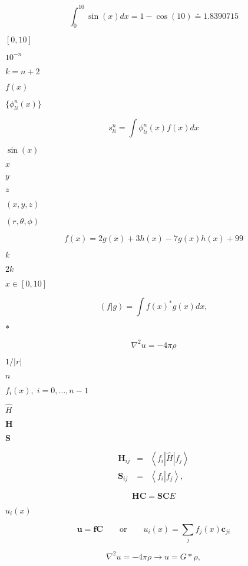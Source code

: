 \documentclass{article}
\begin{document}
\[
\int_{0}^{10} \sin (x) \mathit{dx} = 1 - \cos(10) \doteq 1.8390715
\]
\pagebreak

$[0,10]$
\pagebreak

$10^{-n}$
\pagebreak

$k=n+2$
\pagebreak

$ f(x) $
\pagebreak

$\{\phi _{li}^{n}(x)\}$
\pagebreak

\[
s_{li}^{n} = \int \phi _{li}^{n}(x) f(x) \mathit{dx}
\]
\pagebreak

$\sin(x)$
\pagebreak

$x$
\pagebreak

$y$
\pagebreak

$z$
\pagebreak

$(x, y, z)$
\pagebreak

$(r, \theta, \phi)$
\pagebreak

\[
f(x) = 2g(x) + 3h(x) - 7g(x)h(x) + 99
\]
\pagebreak

$k$
\pagebreak

$2k$
\pagebreak

$x\in [0,10]$
\pagebreak

\[
\left( f \left| g \right. \right) = \int f(x)^\textrm{*} g(x) dx,
\]
\pagebreak

$\textrm{*}$
\pagebreak

\[
\nabla^{2} u = -4\pi \rho 
\]
\pagebreak

$1/\left| r \right|$
\pagebreak

$n$
\pagebreak

$f_{i}(x),\; i=0, \ldots, n-1$
\pagebreak

$\hat{H}$
\pagebreak

$\mathbf{H}$
\pagebreak

$\mathbf{S}$
\pagebreak

\begin{eqnarray*}
\mathbf{H}_{ij} & = & \left< f_i \left| \hat{H} \right| f_j \right> \\
\mathbf{S}_{ij} & = & \left< f_i \left|         \right. f_j \right>,
\end{eqnarray*}
\pagebreak

\[
\mathbf{HC}=\mathbf{SC}E
\]
\pagebreak

$u_{i}(x)$
\pagebreak

\[
\mathbf{u}=\mathbf{fC} \qquad \mathrm{or} \qquad u_{i}(x) = \sum _{j} f_{j}(x) \mathbf{c}_{ji}
\]
\pagebreak

\[
\nabla^{2} u = -4\pi\rho \to u=G \ast \rho,
\]
\pagebreak
\end{document}
